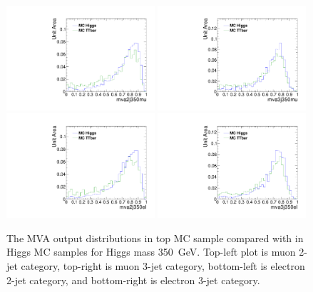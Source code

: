 \begin{figure}[!t]
  \centering
  \includegraphics[width=0.49\textwidth]{figs/cl-mva2j350mu-mvaTopvsHiggs.pdf}
  \includegraphics[width=0.49\textwidth]{figs/cl-mva3j350mu-mvaTopvsHiggs.pdf}
  \includegraphics[width=0.49\textwidth]{figs/cl-mva2j350el-mvaTopvsHiggs.pdf}
  \includegraphics[width=0.49\textwidth]{figs/cl-mva3j350el-mvaTopvsHiggs.pdf}
  \caption{\label{fig:mva:sigvsttbar-mva2j350}The MVA output
    distributions in top MC sample compared with in Higgs MC
    samples for Higgs mass 350~GeV. Top-left plot is muon 2-jet category,
    top-right is muon 3-jet category, bottom-left is electron 2-jet
    category, and bottom-right is electron 3-jet category. }
\end{figure}

